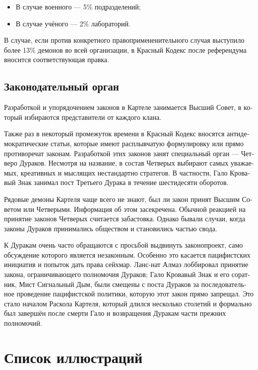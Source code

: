 \documentclass[a4paper,12pt,fleqn]{book}\usepackage{cooltooltips}\usepackage{polyglossia}\setdefaultlanguage[babelshorthands=true]{russian}\setotherlanguage{english}\defaultfontfeatures{Ligatures=TeX,Mapping=tex-text} \usepackage{xcolor}\definecolor{lightgray}{HTML}{bbbbbb}\color{lightgray}\newcommand{\ml}[3]{\textenglish{\textcolor{black}{#3}}}
\begin{document}
{\begin{itemize}
\item В случае военного --- 5\% подразделений;
\item В случае учёного --- 2\% лабораторий.
\end{itemize}

В случае, если против конкретного правопримененительного случая выступило более 13\% демонов во всей организации, в Красный Кодекс после референдума вносится соответствующая правка.

\subsection{Законодательный орган}

Разработкой и упорядочением законов в Картеле занимается Высший Совет, в который избираются представители от каждого клана.

Также раз в некоторый промежуток времени в Красный Кодекс вносятся антидемократические статьи, которые имеют расплывчатую формулировку или прямо противоречат законам.
Разработкой этих законов занят специальный орган --- Четверо Дураков.
Несмотря на название, в состав Четверых выбирают самых уважаемых, креативных и мыслящих нестандартно стратегов.
В частности, Гало Кровавый Знак занимал пост Третьего Дурака в течение шестидесяти оборотов.

Рядовые демоны Картеля чаще всего не знают, был ли закон принят Высшим Советом или Четверыми.
Информация об этом засекречена.
Обычной реакцией на принятие законов Четверых считается забастовка.
Однако бывали случаи, когда законы Дураков принимались обществом и становились частью свода.

К Дуракам очень часто обращаются с просьбой выдвинуть законопроект, само обсуждение которого является незаконным.
Особенно это касается пацифистских инициатив и попыток дать права сейхмар.
Ланс-нат Алмаз лоббировал принятие закона, ограничивающего полномочия Дураков;
Гало Кровавый Знак и его соратник, Мист Сигнальный Дым, были смещены с поста Дураков за последовательное проведение пацифистской политики, которую этот закон прямо запрещал.
Это стало началом Раскола Картеля, который длился несколько столетий и формально был завершён после смерти Гало и возвращения Дуракам части прежних полномочий.


\section{Список иллюстраций}

}
\end{document}
